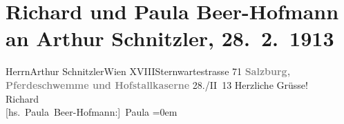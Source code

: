

         
         \renewcommand{\erwaehntePersonen}{Personen: Richard Beer-Hofmann, Paula Beer-Hofmann}
         \renewcommand{\erwaehnteOrte}{Orte: Hofmarstallschwemme, Hofstallkaserne, Salzburg, Sternwartestraße, Wien, XVIII., Währing}
         \renewcommand{\erwaehnteWerke}{}
               \section[Richard und Paula Beer-Hofmann an Arthur Schnitzler, 28. 2. 1913]{ Richard und Paula Beer-Hofmann an Arthur Schnitzler,
               28. 2. 1913}\nopagebreak{}\rehead{ }\begin{ledgroupsized}[t]{13cm}\normalsize\beginnumbering \toendnotes[C]{\smallbreak\pagebreak[2]} 
\pstart{}{\pb}Herrn\pend{}\pstart{}Arthur Schnitzler\pend{}\pstart{}Wien XVIII\pend{}\pstart{}Sternwartestrasse 71\pend{}{\bigskip}\pstart
           \noindent{}\centering{}{\pb}\textcolor{gray}{\textbf{Salzburg, Pferdeschwemme und Hofstallkaserne}}\pend
           \pstart
           {\pb}28./II 13\pend
           \pstart
           Herzliche Grüsse!{\\[\baselineskip]}\spacefill\mbox{Richard}{\\[\baselineskip]}\spacefill\mbox{{[}hs. Paula Beer-Hofmann:{]} Paula}\pend
           \leftskip=0em{}
         
         \endnumbering{}\end{ledgroupsized}  \newcommand{\dateiname}{L02115}\newcommand{\titel}{Richard und Paula Beer-Hofmann an Arthur Schnitzler, 28. 2. 1913}\newcommand{\editorInnen}{Martin Anton Müller und Gerd-Hermann Susen}
      